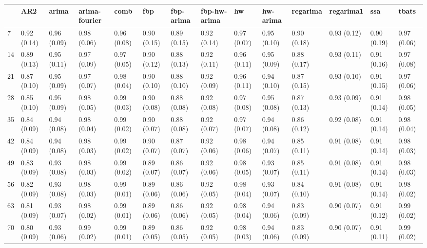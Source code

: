 \begin{tabular}{llllllllllllll}
\toprule
{} &          AR2 &        arima & arima-fourier &         comb &          fbp &    fbp-arima & fbp-hw-arima &           hw &     hw-arima &     regarima &    regarima1 &          ssa &        tbats \\
\midrule
7   &  0.92 (0.14) &  0.96 (0.09) &   0.98 (0.06) &  0.96 (0.08) &  0.90 (0.15) &  0.89 (0.15) &  0.92 (0.14) &  0.97 (0.07) &  0.95 (0.10) &  0.90 (0.18) &  0.93 (0.12) &  0.90 (0.19) &  0.97 (0.06) \\
14  &  0.89 (0.13) &  0.95 (0.11) &   0.97 (0.09) &  0.97 (0.05) &  0.90 (0.12) &  0.88 (0.13) &  0.92 (0.11) &  0.96 (0.11) &  0.95 (0.09) &  0.88 (0.17) &  0.93 (0.11) &  0.91 (0.16) &  0.97 (0.08) \\
21  &  0.87 (0.10) &  0.95 (0.09) &   0.97 (0.07) &  0.98 (0.04) &  0.90 (0.10) &  0.88 (0.10) &  0.92 (0.09) &  0.96 (0.11) &  0.94 (0.10) &  0.87 (0.15) &  0.93 (0.10) &  0.91 (0.15) &  0.97 (0.06) \\
28  &  0.85 (0.10) &  0.95 (0.09) &   0.98 (0.05) &  0.99 (0.03) &  0.90 (0.08) &  0.88 (0.08) &  0.92 (0.08) &  0.97 (0.08) &  0.95 (0.08) &  0.87 (0.13) &  0.93 (0.09) &  0.91 (0.14) &  0.98 (0.05) \\
35  &  0.84 (0.09) &  0.94 (0.08) &   0.98 (0.04) &  0.99 (0.02) &  0.90 (0.07) &  0.88 (0.08) &  0.92 (0.07) &  0.97 (0.07) &  0.94 (0.08) &  0.86 (0.12) &  0.92 (0.08) &  0.91 (0.14) &  0.98 (0.04) \\
42  &  0.84 (0.09) &  0.94 (0.08) &   0.98 (0.03) &  0.99 (0.02) &  0.90 (0.07) &  0.87 (0.07) &  0.92 (0.06) &  0.98 (0.06) &  0.94 (0.07) &  0.85 (0.11) &  0.91 (0.08) &  0.91 (0.14) &  0.98 (0.03) \\
49  &  0.83 (0.09) &  0.93 (0.08) &   0.98 (0.03) &  0.99 (0.02) &  0.89 (0.07) &  0.86 (0.07) &  0.92 (0.06) &  0.98 (0.05) &  0.93 (0.07) &  0.85 (0.11) &  0.91 (0.08) &  0.91 (0.14) &  0.98 (0.03) \\
56  &  0.82 (0.09) &  0.93 (0.08) &   0.98 (0.03) &  0.99 (0.01) &  0.89 (0.06) &  0.86 (0.06) &  0.92 (0.05) &  0.98 (0.04) &  0.93 (0.07) &  0.84 (0.10) &  0.91 (0.08) &  0.91 (0.14) &  0.98 (0.02) \\
63  &  0.81 (0.09) &  0.93 (0.07) &   0.98 (0.02) &  0.99 (0.01) &  0.89 (0.06) &  0.86 (0.06) &  0.92 (0.05) &  0.98 (0.04) &  0.94 (0.06) &  0.83 (0.09) &  0.90 (0.07) &  0.91 (0.12) &  0.99 (0.02) \\
70  &  0.80 (0.09) &  0.93 (0.06) &   0.99 (0.02) &  0.99 (0.01) &  0.89 (0.05) &  0.86 (0.05) &  0.92 (0.05) &  0.98 (0.03) &  0.94 (0.06) &  0.83 (0.09) &  0.90 (0.07) &  0.91 (0.11) &  0.99 (0.02) \\

\end{tabular}

